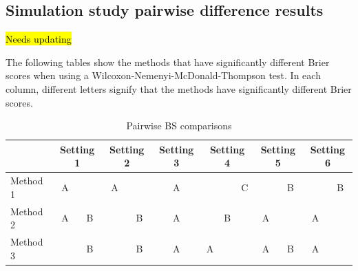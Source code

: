 \documentclass[11pt]{article}
\begin{document}

\subsection{Simulation study pairwise difference results} \label{rba:pdiffs}
\hl{Needs updating}

The following tables show the methods that have significantly different Brier scores when using a Wilcoxon-Nemenyi-McDonald-Thompson test.
In each column, different letters signify that the methods have significantly different Brier scores.

\begin{table}[htbp]
  \centering
  \caption{Pairwise BS comparisons}
  \label{rbtbl:pwbssim}
  \begin{tabular}{|l|cc|cc|c|ccc|cc|cc|}
  \cline{2-13}
  \multicolumn{1}{c}{} & \multicolumn{2}{|c}{Setting 1} & \multicolumn{2}{|c}{Setting 2} & \multicolumn{1}{|c}{Setting 3} & \multicolumn{3}{|c}{Setting 4} & \multicolumn{2}{|c}{Setting 5} & \multicolumn{2}{|c|}{Setting 6}\\
  \hline
  Method 1 & A &   & A &   & A &   &   & C &   & B &   & B \\
  \hline
  Method 2 & A & B &   & B & A &   & B &   & A &   & A &   \\
  \hline
  Method 3 &   & B &   & B & A & A &   &   & A & B & A &   \\
  \hline
  \end{tabular}
\end{table}
\end{document}
